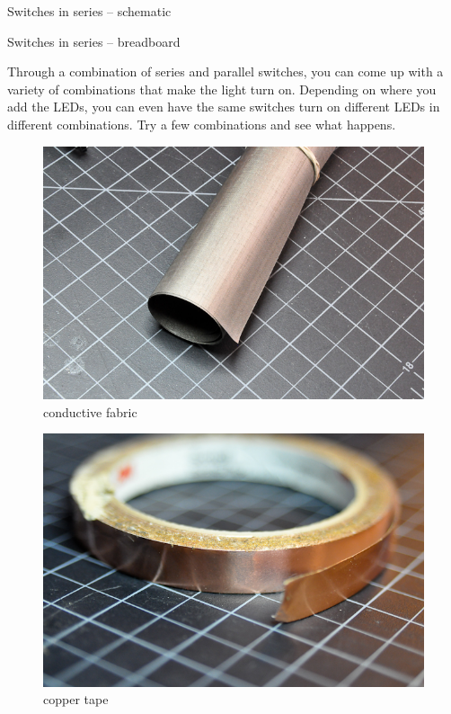 Switches in series -- schematic

Switches in series -- breadboard

Through a combination of series and parallel switches, you can come up with a variety of combinations that make the light turn on. Depending on where you add the LEDs, you can even have the same switches turn on different LEDs in different combinations. Try a few combinations and see what happens.

\begin{figure}[!htb]
 \centering
 \includegraphics[scale=0.3]{img/switches/conductive_fabric.jpg}
 \caption{conductive fabric}
 \label{conductive fabric}
\end{figure}


\begin{figure}[!htb]
 \centering
 \includegraphics[scale=0.3]{img/switches/copper_tape.jpg}
 \caption{copper tape}
 \label{copper tape}
\end{figure}





